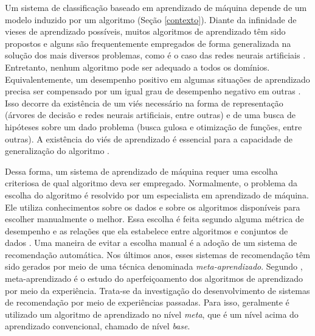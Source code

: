 Um sistema de classificação baseado em aprendizado de máquina depende de um modelo induzido por um algoritmo (Seção \ref{contexto}).
Diante da infinidade de vieses de aprendizado possíveis, muitos algoritmos de aprendizado têm sido propostos e alguns são frequentemente empregados de forma generalizada na solução dos mais diversos problemas, como é o caso das redes neurais artificiais \cite{haykin2004comprehensive}.
Entretanto, nenhum algoritmo pode ser adequado a todos os domínios.
Equivalentemente, um desempenho positivo em algumas situações de aprendizado precisa ser compensado por um igual grau de desempenho negativo em outras \cite{journals/tec/DolpertM97,conf/icml/Schaffer94}.
Isso decorre da existência de um viés necessário na forma de representação
(árvores de decisão e redes neurais artificiais, entre outras) e de uma busca de hipóteses sobre um dado problema (busca gulosa e otimização de funções, entre outras).
A existência do viés de aprendizado é essencial para a capacidade de generalização do algoritmo \cite{Mitchell:1980}.

Dessa forma, um sistema de aprendizado de máquina requer uma escolha criteriosa de qual algoritmo deva ser empregado.
Normalmente, o problema da escolha do algoritmo é resolvido por um especialista em aprendizado de máquina. Ele utiliza conhecimentos sobre os dados e sobre os algoritmos disponíveis para escolher manualmente o melhor.
Essa escolha é feita segundo alguma métrica de desempenho e as relações que ela estabelece entre algoritmos e conjuntos de dados \cite{books/daglib/0022052}.
Uma maneira de evitar a escolha manual é a adoção de um sistema de recomendação automática.
Nos últimos anos, esses sistemas de recomendação têm sido gerados por meio de uma técnica denominada \textit{meta-aprendizado}.
Segundo , meta-aprendizado é o estudo do aperfeiçoamento dos algoritmos de aprendizado por meio da experiência.
Trata-se da investigação do desenvolvimento de sistemas de recomendação por meio de experiências passadas.
Para isso, geralmente é utilizado um algoritmo de aprendizado no 
nível \textit{meta}, que é um nível acima do aprendizado convencional, chamado de nível \textit{base}.

